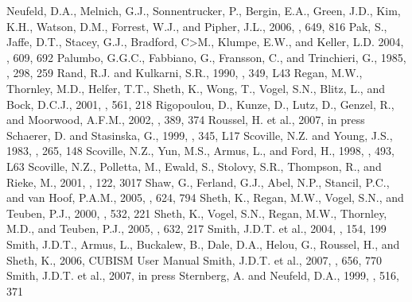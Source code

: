 \documentclass[manuscript]{aastex}
\begin{document}
\begin{thebibliography}{}
 Neufeld, D.A., Melnich, G.J., Sonnentrucker, P., Bergin, E.A., Green, J.D., Kim, K.H., Watson, D.M., Forrest, W.J., and Pipher, J.L., 2006, \apj, 649, 816 
 Pak, S., Jaffe, D.T., Stacey, G.J., Bradford, C>M., Klumpe, E.W., and Keller, L.D. 2004, \apj, 609, 692
 Palumbo, G.G.C., Fabbiano, G., Fransson, C., and Trinchieri, G., 1985, \apj, 298, 259
 Rand, R.J. and Kulkarni, S.R., 1990, \apj, 349, L43
 Regan, M.W., Thornley, M.D., Helfer, T.T., Sheth, K., Wong, T., Vogel, S.N., Blitz, L., and Bock, D.C.J., 2001, \apj, 561, 218
 Rigopoulou, D., Kunze, D., Lutz, D., Genzel, R., and Moorwood, A.F.M., 2002, \aap, 389, 374
 Roussel, H. et al., 2007, in press
 Schaerer, D. and Stasinska, G., 1999, \aap, 345, L17
 Scoville, N.Z. and Young, J.S., 1983, \aj, 265, 148
 Scoville, N.Z., Yun, M.S., Armus, L., and Ford, H., 1998, \apj, 493, L63 
 Scoville, N.Z., Polletta, M., Ewald, S., Stolovy, S.R., Thompson, R., and Rieke, M., 2001, \aj, 122, 3017
 Shaw, G., Ferland, G.J., Abel, N.P., Stancil, P.C., and van Hoof, P.A.M., 2005, \apj, 624, 794
 Sheth, K., Regan, M.W., Vogel, S.N., and Teuben, P.J., 2000, \apj, 532, 221 
 Sheth, K., Vogel, S.N., Regan, M.W., Thornley, M.D., and Teuben, P.J., 2005, \apj, 632, 217
 Smith, J.D.T. et al., 2004, \apjs, 154, 199
 Smith, J.D.T., Armus, L., Buckalew, B., Dale, D.A., Helou, G., Roussel, H., and Sheth, K., 2006, CUBISM User Manual
 Smith, J.D.T. et al., 2007, \apj, 656, 770
 Smith, J.D.T. et al., 2007, in press
 Sternberg, A. and Neufeld, D.A., 1999, \apj, 516, 371

\end{thebibliography}
\end{document}
